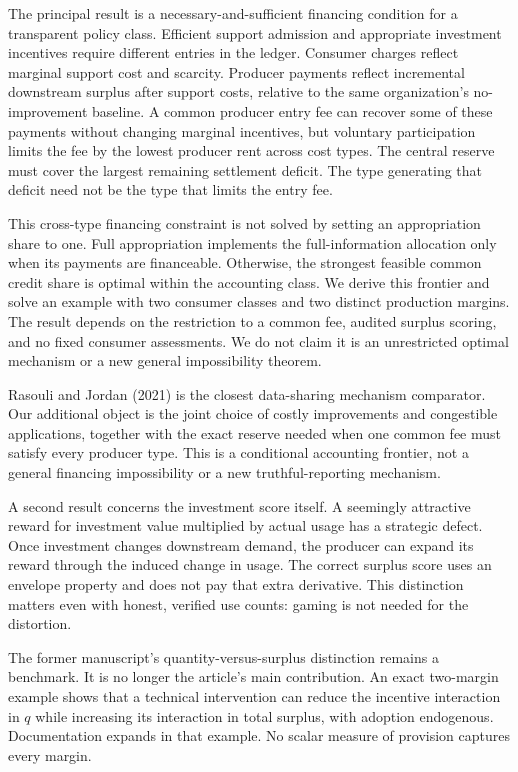 \documentclass[
  11pt,
]{article}
\begin{document}
The principal result is a necessary-and-sufficient financing condition
for a transparent policy class. Efficient support admission and
appropriate investment incentives require different entries in the
ledger. Consumer charges reflect marginal support cost and scarcity.
Producer payments reflect incremental downstream surplus after support
costs, relative to the same organization's no-improvement baseline. A
common producer entry fee can recover some of these payments without
changing marginal incentives, but voluntary participation limits the fee
by the lowest producer rent across cost types. The central reserve must
cover the largest remaining settlement deficit. The type generating that
deficit need not be the type that limits the entry fee.

This cross-type financing constraint is not solved by setting an
appropriation share to one. Full appropriation implements the
full-information allocation only when its payments are financeable.
Otherwise, the strongest feasible common credit share is optimal within
the accounting class. We derive this frontier and solve an example with
two consumer classes and two distinct production margins. The result
depends on the restriction to a common fee, audited surplus scoring, and
no fixed consumer assessments. We do not claim it is an unrestricted
optimal mechanism or a new general impossibility theorem.

Rasouli and Jordan (2021) is the closest data-sharing mechanism
comparator. Our additional object is the joint choice of costly
improvements and congestible applications, together with the exact
reserve needed when one common fee must satisfy every producer type.
This is a conditional accounting frontier, not a general financing
impossibility or a new truthful-reporting mechanism.

A second result concerns the investment score itself. A seemingly
attractive reward for investment value multiplied by actual usage has a
strategic defect. Once investment changes downstream demand, the
producer can expand its reward through the induced change in usage. The
correct surplus score uses an envelope property and does not pay that
extra derivative. This distinction matters even with honest, verified
use counts: gaming is not needed for the distortion.

The former manuscript's quantity-versus-surplus distinction remains a
benchmark. It is no longer the article's main contribution. An exact
two-margin example shows that a technical intervention can reduce the
incentive interaction in \(q\) while increasing its interaction in total
surplus, with adoption endogenous. Documentation expands in that
example. No scalar measure of provision captures every margin.
\end{document}
